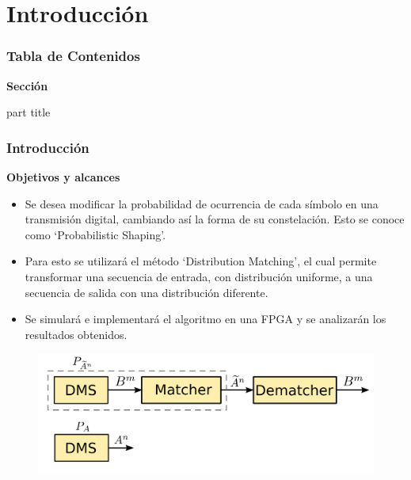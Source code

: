 

\section{Introducci\'on}
\begin{frame}
  \frametitle{\textbf{Tabla de Contenidos}}
  \begin{center}
    {\vspace{-1.5cm}\Large \textbf{Sección \thesection}\vspace{0.5cm}}
    \begin{beamercolorbox}[
      sep=8pt,center]{part title}
      \textbf{\insertsection}
    \end{beamercolorbox}
  \end{center}
\end{frame}


\begin{frame}
  \frametitle{\textbf{Introducción}}
   \begin{block}{\centering \textbf{Objetivos y alcances}}
    \begin{itemize} %
        \item Se desea modificar la probabilidad de ocurrencia de cada símbolo en una   transmisión digital, cambiando así la forma de su constelación. Esto se conoce como `Probabilistic Shaping'. 
        \item Para esto se utilizará el método `Distribution Matching', el cual permite transformar una secuencia de entrada, con distribución uniforme, a una secuencia de salida con una distribución diferente. 
        \item Se simulará e implementará el algoritmo en una FPGA y se analizarán los resultados obtenidos.
    \end{itemize}
    \end{block}
    \vspace{-0.2cm}
    \begin{figure}[!t] \centering
    \includegraphics[width=0.70\paperwidth]{Diagramas/matcher.png}
    \end{figure}
\end{frame}


